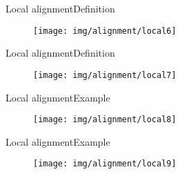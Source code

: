 \documentclass[10pt]{beamer}
\newcommand{\1}{
	\setbeamertemplate{background}{
		\texttt{[image: img/1]}
		\tikz[overlay] \fill[fill opacity=0.75,fill=white] (0,0) rectangle (-\paperwidth,\paperheight);
	}
}
\begin{document}
\begin{frame}{Local alignment}{Definition}		
	\begin{figure}[]
		\centering
		\texttt{[image: img/alignment/local6]}
		\label{img:uniprot}
	\end{figure}
\end{frame}


\begin{frame}{Local alignment}{Definition}		
	\begin{figure}[]
		\centering
		\texttt{[image: img/alignment/local7]}
		\label{img:uniprot}
	\end{figure}
\end{frame}


\begin{frame}{Local alignment}{Example}		
	\begin{figure}[]
		\centering
		\texttt{[image: img/alignment/local8]}
		\label{img:uniprot}
	\end{figure}
\end{frame}


\begin{frame}{Local alignment}{Example}		
	\begin{figure}[]
		\centering
		\texttt{[image: img/alignment/local9]}
		\label{img:uniprot}
	\end{figure}
\end{frame}
\end{document}
